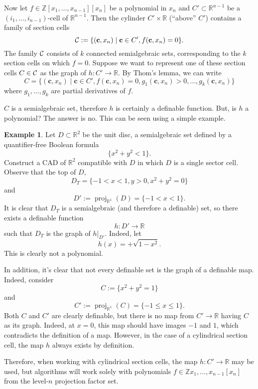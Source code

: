 \documentclass[
]{book}
\theoremstyle{definition}
\theoremstyle{definition}
\newtheorem{example}{Example}[chapter]
\theoremstyle{definition}
\theoremstyle{definition}
\theoremstyle{remark}
\begin{document}
Now let \(f \in \mathbb{Z}[x_1,\ldots,x_{n-1}][x_n]\) be a polynomial in \(x_n\) and \(C' \subset \mathbb{R}^{n-1}\) be a \((i_1,\ldots,i_{n-1})\)-cell of \(\mathbb{R}^{n-1}\). Then the cylinder \(C' \times \mathbb{R}\) (``above'' \(C'\)) contains a family of section cells
\[
{\cal C} := \{ (\mathbf{c},x_n) \mid \mathbf{c} \in C', f(\mathbf{c},x_n) = 0 \}.
\]
The family \(\cal C\) consists of \(k\) connected semialgebraic sets, corresponding to the \(k\) section cells on which \(f = 0\).
Suppose we want to represent one of these section cells \(C \in {\cal C}\) as the graph of \(h : C' \to \mathbb{R}\). By Thom's lemma, we can write
\[
C = \{ (\mathbf{c},x_n) \mid \mathbf{c} \in C', f(\mathbf{c},x_n) = 0, g_1(\mathbf{c},x_n) > 0, \ldots, g_k(\mathbf{c},x_n) \}
\]
where \(g_1,\ldots,g_k\) are partial derivatives of \(f\).

\(C\) is a semialgebraic set, therefore \(h\) is certainly a definable function.
But, is \(h\) a polynomial? The answer is no. This can be seen using a simple example.

\begin{example}
Let \(D \subset \mathbb{R}^2\) be the unit disc, a semialgebraic set defined by a quantifier-free Boolean formula
\[
\{ x^2 + y^2 < 1 \}.
\]
Construct a CAD of \(\mathbb{R}^2\) compatible with \(D\) in which \(D\) is a single sector cell. Observe that the top of \(D\),
\[
D_T = \{ -1 < x < 1, y > 0, x^2 + y^2 = 0 \}
\]
and
\[
D' := {\operatorname{proj}_{\mathbb{R}^{1}}}(D) = \{ -1 < x < 1 \}.
\]
It is clear that \(D_T\) is a semialgebraic (and therefore a definable) set, so there exists a definable function
\[
h : D' \to \mathbb{R}
\]
such that \(D_T\) is the graph of \(h\vert_{D'}\). Indeed, let
\[
h(x) = +\sqrt{1-x^2}.
\]
This is clearly not a polynomial.
\end{example}

In addition, it's clear that not every definable set is the graph of a definable map. Indeed, consider
\[
C := \{ x^2 + y^2 = 1 \}
\]
and
\[
C' := {\operatorname{proj}_{\mathbb{R}^{1}}}(C) = \{ -1 \le x \le 1 \}.
\]
Both \(C\) and \(C'\) are clearly definable, but there is no map from \(C' \to \mathbb{R}\) having \(C\) as its graph. Indeed, at \(x=0\), this map should have images \(-1\) and \(1\), which contradicts the definition of a map. However, in the case of a cylindrical section cell, the map \(h\) always exists by definition.

Therefore, when working with cylindrical section cells, the map \(h : C' \to \mathbb{R}\) may be used, but algorithms will work solely with polynomials \(f \in \mathbb{Z}{x_1,\ldots,x_{n-1}}[x_n]\) from the level-\(n\) projection factor set.
\end{document}
